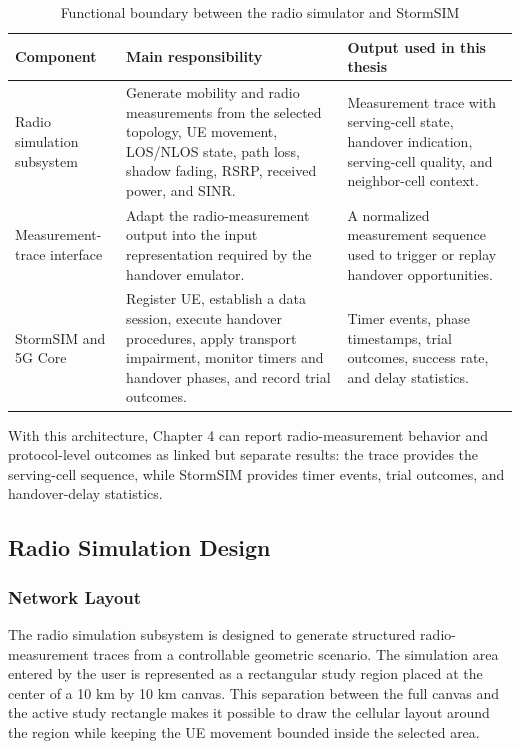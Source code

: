 \begin{table}[!htbp]
\centering
\caption{Functional boundary between the radio simulator and StormSIM}
\small
{\renewcommand{\arraystretch}{1.35}
\renewcommand{\tabularxcolumn}[1]{p{#1}}
\begin{tabularx}{\textwidth}{>{\raggedright\arraybackslash}p{3.0cm}>{\raggedright\arraybackslash}X>{\raggedright\arraybackslash}X}
\toprule
Component & Main responsibility & Output used in this thesis\\
\midrule
Radio simulation subsystem & Generate mobility and radio measurements from the selected topology, UE movement, LOS/NLOS state, path loss, shadow fading, RSRP, received power, and SINR. & Measurement trace with serving-cell state, handover indication, serving-cell quality, and neighbor-cell context.\\
Measurement-trace interface & Adapt the radio-measurement output into the input representation required by the handover emulator. & A normalized measurement sequence used to trigger or replay handover opportunities.\\
StormSIM and 5G Core & Register UE, establish a data session, execute handover procedures, apply transport impairment, monitor timers and handover phases, and record trial outcomes. & Timer events, phase timestamps, trial outcomes, success rate, and delay statistics.\\
\bottomrule
\end{tabularx}}
\label{tab:system-functional-boundary}
\end{table}

With this architecture, Chapter 4 can report radio-measurement behavior and
protocol-level outcomes as linked but separate results: the trace provides the
serving-cell sequence, while StormSIM provides timer events, trial outcomes, and
handover-delay statistics.

\subsection{Radio Simulation Design}

\subsubsection{Network Layout}

The radio simulation subsystem is designed to generate structured radio-measurement traces from a controllable geometric scenario. The simulation area entered by the user is represented as a rectangular study region placed at the center of a 10 km by 10 km canvas. This separation between the full canvas and the active study rectangle makes it possible to draw the cellular layout around the region while keeping the UE movement bounded inside the selected area.

